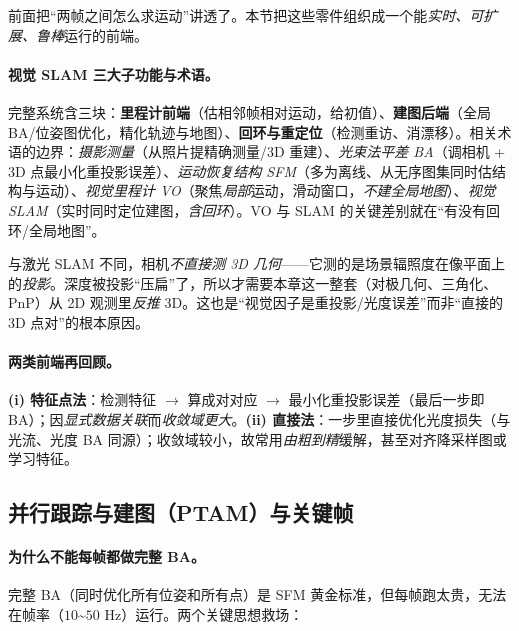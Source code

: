 前面把“两帧之间怎么求运动”讲透了。本节把这些零件组织成一个能\emph{实时、可扩展、鲁棒}运行的前端\cite{carlone2026handbook}。

\paragraph{视觉 SLAM 三大子功能与术语\cite{carlone2026handbook}。}完整系统含三块：\textbf{里程计前端}（估相邻帧相对运动，给初值）、\textbf{建图后端}（全局 BA/位姿图优化，精化轨迹与地图）、\textbf{回环与重定位}（检测重访、消漂移）。相关术语的边界：\emph{摄影测量}（从照片提精确测量/3D 重建）、\emph{光束法平差 BA}（调相机 + 3D 点最小化重投影误差）、\emph{运动恢复结构 SFM}（多为离线、从无序图集同时估结构与运动）、\emph{视觉里程计 VO}（聚焦\emph{局部}运动，滑动窗口，\emph{不建全局地图}）、\emph{视觉 SLAM}（实时同时定位建图，\emph{含回环}）。VO 与 SLAM 的关键差别就在“有没有回环/全局地图”。

\begin{insight}
与激光 SLAM 不同，相机\emph{不直接测 3D 几何}——它测的是场景辐照度在像平面上的\emph{投影}\cite{carlone2026handbook}。深度被投影“压扁”了，所以才需要本章这一整套（对极几何、三角化、PnP）从 2D 观测里\emph{反推} 3D。这也是“视觉因子是重投影/光度误差”而非“直接的 3D 点对”的根本原因。
\end{insight}

\paragraph{两类前端再回顾\cite{carlone2026handbook}。}\textbf{(i) 特征点法}：检测特征 $\to$ 算成对对应 $\to$ 最小化重投影误差（最后一步即 BA）；因\emph{显式数据关联}而\emph{收敛域更大}。\textbf{(ii) 直接法}：一步里直接优化光度损失（与光流、光度 BA 同源）；收敛域较小，故常用\emph{由粗到精}缓解，甚至对齐降采样图或学习特征。

\subsection{并行跟踪与建图（PTAM）与关键帧}
\label{sec:vo-ptam}

\paragraph{为什么不能每帧都做完整 BA。}完整 BA（同时优化所有位姿和所有点）是 SFM 黄金标准，但每帧跑太贵，无法在帧率（$10$\textasciitilde$50$ Hz）运行\cite{carlone2026handbook}。两个关键思想救场：

